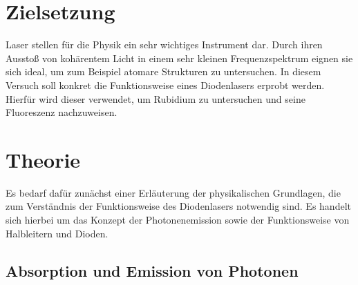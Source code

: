 \section{Zielsetzung}

Laser stellen für die Physik ein sehr wichtiges Instrument dar. Durch ihren Ausstoß von kohärentem Licht in einem sehr kleinen Frequenzspektrum eignen sie
sich ideal, um zum Beispiel atomare Strukturen zu untersuchen. In diesem Versuch soll konkret die Funktionsweise eines Diodenlasers erprobt werden. Hierfür wird dieser
verwendet, um Rubidium zu untersuchen und seine Fluoreszenz nachzuweisen.


\section{Theorie}
\label{sec:Theorie}

Es bedarf dafür zunächst einer Erläuterung der physikalischen Grundlagen, die zum Verständnis der Funktionsweise des Diodenlasers notwendig sind. Es handelt sich
hierbei um das Konzept der Photonenemission sowie der Funktionsweise von Halbleitern und Dioden.


\subsection{Absorption und Emission von Photonen}
\label{subsec:absorption}

